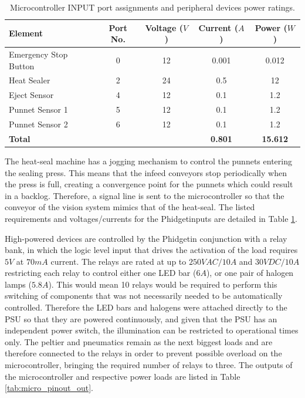\documentclass[fleqn,twoside,12pt]{report}
\begin{document}
\renewcommand{\arraystretch}{0.8}%
\begin{table}[h]
	\centering
	\caption{Microcontroller INPUT port assignments and peripheral devices power ratings.}
	\label{tab:micro_pinout_in}
	\begin{tabular}{lcccc}
		
		\toprule
		\textbf{Element}  & \textbf{Port No.} & \textbf{Voltage ($V$)} & \textbf{Current ($A$)} & \textbf{Power ($W$)}\\[8pt]
		\midrule
		Emergency Stop Button 	& 0 & 12 & 0.001 & 0.012  \\[4pt]
		\midrule
		Heat Sealer 			& 2 & 24 & 0.5 & 12 \\[4pt]
		\midrule
		Eject Sensor 			& 4 & 12 & 0.1 & 1.2  \\[4pt]
		\midrule
		Punnet Sensor 1 		& 5 & 12 & 0.1 & 1.2 \\[4pt]
		\midrule
		Punnet Sensor 2 		& 6 & 12 & 0.1 & 1.2  \\[4pt]
		\midrule
		\textbf{Total} 			&   &    & \textbf{0.801} & \textbf{15.612} \\[4pt]
		\bottomrule
		
	\end{tabular}
\end{table}


The heat-seal machine has a jogging mechanism to control the punnets entering the sealing press. This means that the infeed conveyors stop periodically when the press is full, creating a convergence point for the punnets which could result in a backlog. Therefore, a signal line is sent to the microcontroller so that the conveyor of the vision system mimics that of the heat-seal. The listed requirements and voltages/currents for the Phidget\texttrademark inputs are detailed in Table \ref{tab:micro_pinout_in}.

High-powered devices are controlled by the Phidget\texttrademark in conjunction with a relay bank, in which the logic level input that drives the activation of the load requires $5V$ at $70mA$ current. The relays are rated at up to $250VAC/10A$ and $30VDC/10A$ restricting each relay to control either one LED bar ($6A$), or one pair of halogen lamps ($5.8A$). This would mean 10 relays would be required to perform this switching of components that was not necessarily needed to be automatically controlled. Therefore the LED bars and halogens were attached directly to the PSU so that they are powered continuously, and given that the PSU has an independent power switch, the illumination can be restricted to operational times only. The peltier and pneumatics remain as the next biggest loads and are therefore connected to the relays in order to prevent possible overload on the microcontroller, bringing the required number of relays to three. The outputs of the microcontroller and respective power loads are listed in Table \ref{tab:micro_pinout_out}.
\end{document}
